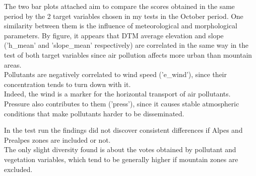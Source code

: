 The two bar plots attached aim to compare the scores obtained in the same period by the 2 target variables chosen in my tests in the October period.
One similarity between them is the influence of meteorological and morphological parameters.
By figure, it appears that DTM average elevation and slope ('h\_mean' and 'slope\_mean' respectively) are correlated in the same way in the test of both target variables since air pollution affects more urban than mountain areas.\\
Pollutants are negatively correlated to wind speed ('e\_wind'), since their concentration tends to turn down with it.\\ 
Indeed, the wind is a marker for the horizontal transport of air pollutants. Pressure also contributes to them ('press'), since it causes stable atmospheric conditions that make pollutants harder to be disseminated.
\par
In the test run the findings did not discover consistent differences if Alpes and Prealpes zones are included or not.\\
The only slight diversity found is about the votes obtained by pollutant and vegetation variables, which tend to be generally higher if mountain zones are excluded.

